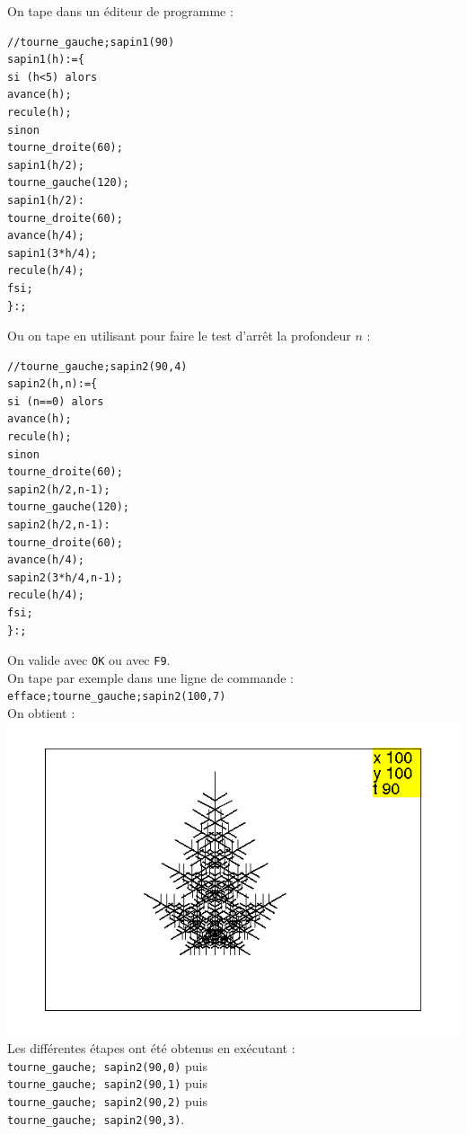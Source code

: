 \documentclass[a4paper,11pt]{book}
\begin{document}
On tape dans un \'editeur de programme :
\begin{verbatim}
//tourne_gauche;sapin1(90)
sapin1(h):={
si (h<5) alors
avance(h);
recule(h);
sinon
tourne_droite(60);
sapin1(h/2);
tourne_gauche(120);
sapin1(h/2):
tourne_droite(60);
avance(h/4);
sapin1(3*h/4);
recule(h/4);
fsi;
}:;
\end{verbatim}
Ou on tape en utilisant pour faire le test d'arr\^et la profondeur $n$ :
\begin{verbatim}
//tourne_gauche;sapin2(90,4)
sapin2(h,n):={
si (n==0) alors
avance(h);
recule(h);
sinon
tourne_droite(60);
sapin2(h/2,n-1);
tourne_gauche(120);
sapin2(h/2,n-1):
tourne_droite(60);
avance(h/4);
sapin2(3*h/4,n-1);
recule(h/4);
fsi;
}:;
\end{verbatim}
On valide avec {\tt OK} ou avec {\tt F9}.\\
On tape par exemple dans une ligne de commande :\\
{\tt efface;tourne\_gauche;sapin2(100,7)}\\
On obtient :\\
\includegraphics[width=\textwidth]{tortsap2}\\
Les diff\'erentes \'etapes ont \'et\'e obtenus en ex\'ecutant :\\
{\tt tourne\_gauche; sapin2(90,0)} puis\\
{\tt tourne\_gauche; sapin2(90,1)} puis\\
{\tt tourne\_gauche; sapin2(90,2)} puis\\
{\tt tourne\_gauche; sapin2(90,3)}.  
\end{document}
